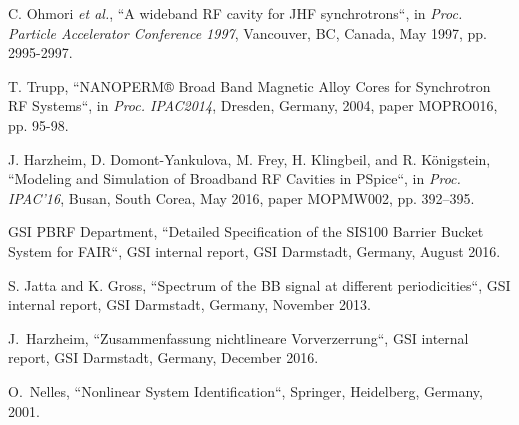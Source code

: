 \documentclass[a4paper,
              ]{jacow}
\begin{document}
\begin{thebibliography}{99}
	
	
	
	
	
	C. Ohmori \textit{et al.}, “A wideband RF cavity for JHF synchrotrons“, 
	in \textit{Proc. Particle Accelerator Conference 1997}, Vancouver, BC, Canada, May 1997, pp. 2995-2997.

	T. Trupp, “NANOPERM® Broad Band Magnetic Alloy Cores for Synchrotron RF Systems“,
	in \textit{Proc. IPAC2014}, Dresden, Germany, 2004, paper MOPRO016, pp. 95-98.	
	
	J. Harzheim, D. Domont-Yankulova, M. Frey, H. Klingbeil, and R. Königstein,
	“Modeling and Simulation of Broadband RF Cavities in PSpice“,
	in \textit{Proc. IPAC’16},
	Busan, South Corea, May 2016, 
	paper MOPMW002, pp. 392--395.	
	
	GSI PBRF Department, “Detailed Specification of the SIS100 Barrier Bucket System for FAIR“,
	GSI internal report, GSI Darmstadt, Germany, August 2016.
   
	
	S. Jatta and K. Gross, “Spectrum of the BB signal at different periodicities“,
	GSI internal report, GSI Darmstadt, Germany, November 2013. %
	
	J.~Harzheim, “Zusammenfassung nichtlineare Vorverzerrung“,
	GSI internal report, GSI Darmstadt, Germany, December 2016.
	
	O.~Nelles, “Nonlinear System Identification“,
	Springer, Heidelberg, Germany, 2001.\\
	

\end{thebibliography}
\end{document}
